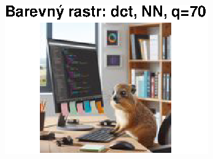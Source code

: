 \begin{figure}[H]
\begin{minipage}[b]{0.3\textwidth}
        \includegraphics[width=\textwidth]{images/barevny_dct_NN_q70.eps}
    \end{minipage}
\end{figure}


